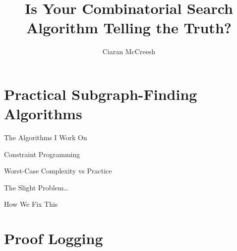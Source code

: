 \documentclass{beamer}
\author{Ciaran McCreesh}
\title{Is Your Combinatorial Search Algorithm Telling the Truth?}
\begin{document}
{
    \begin{frame}
        \titlepage
    \end{frame}
}

\section{Practical Subgraph-Finding Algorithms}

\begin{frame}{The Algorithms I Work On}
\end{frame}

\begin{frame}{Constraint Programming}
\end{frame}

\begin{frame}{Worst-Case Complexity vs Practice}
\end{frame}

\begin{frame}{The Slight Problem\ldots}
\end{frame}

\begin{frame}{How We Fix This}
\end{frame}

\section{Proof Logging}
\end{document}
